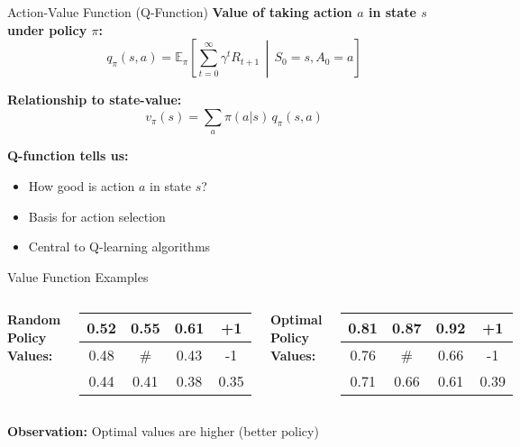 \documentclass[aspectratio=169,10pt]{beamer}
\begin{document}
\begin{frame}{Action-Value Function (Q-Function)}
\textbf{Value of taking action $a$ in state $s$ under policy $\pi$:}
\begin{equation}
q_\pi(s, a) = \mathbb{E}_\pi\left[\sum_{t=0}^{\infty} \gamma^t R_{t+1} \,\middle|\, S_0 = s, A_0 = a\right]
\end{equation}

\textbf{Relationship to state-value:}
\begin{equation}
v_\pi(s) = \sum_a \pi(a|s) \, q_\pi(s, a)
\end{equation}

\textbf{Q-function tells us:}
\begin{itemize}
    \item How good is action $a$ in state $s$?
    \item Basis for action selection
    \item Central to Q-learning algorithms
\end{itemize}
\end{frame}

\begin{frame}{Value Function Examples}
\begin{columns}
\textbf{Random Policy Values:}
\begin{center}
\begin{tabular}{|c|c|c|c|}
\hline
0.52 & 0.55 & 0.61 & +1 \\
\hline
0.48 & \# & 0.43 & -1 \\
\hline
0.44 & 0.41 & 0.38 & 0.35 \\
\hline
\end{tabular}
\end{center}

\textbf{Optimal Policy Values:}
\begin{center}
\begin{tabular}{|c|c|c|c|}
\hline
0.81 & 0.87 & 0.92 & +1 \\
\hline
0.76 & \# & 0.66 & -1 \\
\hline
0.71 & 0.66 & 0.61 & 0.39 \\
\hline
\end{tabular}
\end{center}
\end{columns}

\vspace{0.5cm}
\textbf{Observation:} Optimal values are higher (better policy)
\end{frame}
\end{document}
